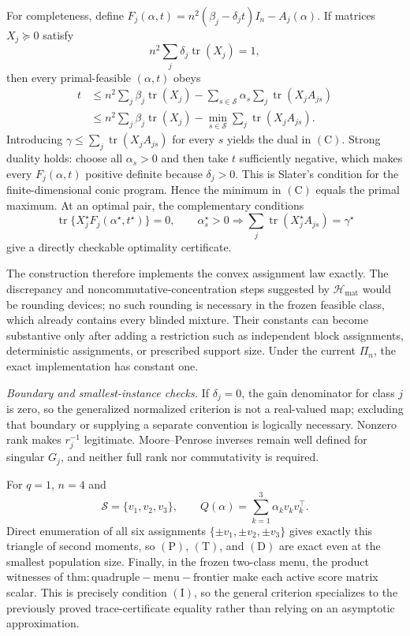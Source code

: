 For completeness, define \(F_j(\alpha,t)=n^2(\beta_j-\delta_jt)I_n-A_j(\alpha)\). If matrices \(X_j\succeq0\) satisfy
\[
n^2\sum_j\delta_j\operatorname{tr}(X_j)=1,
\]
then every primal-feasible \((\alpha,t)\) obeys
\[
\begin{aligned}
t
&\le n^2\sum_j\beta_j\operatorname{tr}(X_j)
-\sum_{s\in\mathscr S}\alpha_s
\sum_j\operatorname{tr}(X_jA_{js})\\
&\le n^2\sum_j\beta_j\operatorname{tr}(X_j)
-\min_{s\in\mathscr S}\sum_j\operatorname{tr}(X_jA_{js}).
\end{aligned}
\tag{9}
\]
Introducing \(\gamma\le\sum_j\operatorname{tr}(X_jA_{js})\) for every \(s\) yields the dual in \((\mathrm C)\). Strong duality holds: choose all \(\alpha_s>0\) and then take \(t\) sufficiently negative, which makes every \(F_j(\alpha,t)\) positive definite because \(\delta_j>0\). This is Slater's condition for the finite-dimensional conic program. Hence the minimum in \((\mathrm C)\) equals the primal maximum. At an optimal pair, the complementary conditions
\[
\operatorname{tr}\{X_j^\star F_j(\alpha^\star,t^\star)\}=0,
\qquad
\alpha_s^\star>0\Longrightarrow
\sum_j\operatorname{tr}(X_j^\star A_{js})=\gamma^\star
\tag{10}
\]
give a directly checkable optimality certificate.

The construction therefore implements the convex assignment law exactly. The discrepancy and noncommutative-concentration steps suggested by \(\mathcal H_{\mathrm{mat}}\) would be rounding devices; no such rounding is necessary in the frozen feasible class, which already contains every blinded mixture. Their constants can become substantive only after adding a restriction such as independent block assignments, deterministic assignments, or prescribed support size. Under the current \(\Pi_n\), the exact implementation has constant one.

\textit{Boundary and smallest-instance checks.}
If \(\delta_j=0\), the gain denominator for class \(j\) is zero, so the generalized normalized criterion is not a real-valued map; excluding that boundary or supplying a separate convention is logically necessary. Nonzero rank makes \(r_j^{-1}\) legitimate. Moore--Penrose inverses remain well defined for singular \(G_j\), and neither full rank nor commutativity is required.

For \(q=1\), \(n=4\) and
\[
\mathscr S=\{v_1,v_2,v_3\},
\qquad
Q(\alpha)=\sum_{k=1}^3\alpha_kv_kv_k^\top.
\]
Direct enumeration of all six assignments \(\{\pm v_1,\pm v_2,\pm v_3\}\) gives exactly this triangle of second moments, so \((\mathrm P)\), \((\mathrm T)\), and \((\mathrm D)\) are exact even at the smallest population size. Finally, in the frozen two-class menu, the product witnesses of \(\mathrm{thm:quadruple-menu-frontier}\) make each active score matrix scalar. This is precisely condition \((\mathrm I)\), so the general criterion specializes to the previously proved trace-certificate equality rather than relying on an asymptotic approximation.